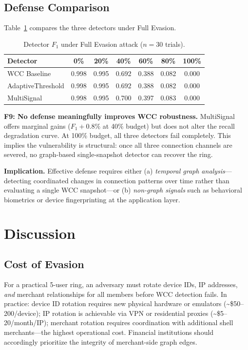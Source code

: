 \documentclass[sigconf,nonacm]{acmart}
\newcommand{\wcc}{\textsc{WCC}\xspace}
\begin{document}
\subsection{Defense Comparison}

Table~\ref{tab:defense} compares the three detectors under Full Evasion.

\begin{table}[h]
\caption{Detector $F_1$ under Full Evasion attack ($n=30$ trials).}
\label{tab:defense}
\centering
\begin{tabular}{lcccccc}
\toprule
Detector & 0\% & 20\% & 40\% & 60\% & 80\% & 100\% \\
\midrule
WCC Baseline      & 0.998 & 0.995 & 0.692 & 0.388 & 0.082 & 0.000 \\
AdaptiveThreshold & 0.998 & 0.995 & 0.692 & 0.388 & 0.082 & 0.000 \\
MultiSignal       & 0.998 & 0.995 & 0.700 & 0.397 & 0.083 & 0.000 \\
\bottomrule
\end{tabular}
\end{table}

\noindent\textbf{F9: No defense meaningfully improves WCC robustness.}
MultiSignal offers marginal gains ($F_1 + 0.8\%$ at 40\% budget) but does
not alter the recall degradation curve.  At 100\% budget, all three
detectors fail completely.  This implies the vulnerability is structural:
once all three connection channels are severed, no graph-based single-snapshot
detector can recover the ring.

\noindent\textbf{Implication.}
Effective defense requires either (a) \emph{temporal graph analysis}---detecting
coordinated changes in connection patterns over time rather than evaluating a
single \wcc snapshot---or (b) \emph{non-graph signals} such as behavioral
biometrics or device fingerprinting at the application layer.

\section{Discussion}

\subsection{Cost of Evasion}

For a practical 5-user ring, an adversary must rotate device IDs, IP
addresses, \emph{and} merchant relationships for all members before \wcc
detection fails.  In practice: device ID rotation requires new physical
hardware or emulators (\textasciitilde\$50--200/device); IP rotation is
achievable via VPN or residential proxies (\textasciitilde\$5--20/month/IP);
merchant rotation requires coordination with additional shell merchants---the
highest operational cost.  Financial institutions should accordingly
prioritize the integrity of merchant-side graph edges.
\end{document}
